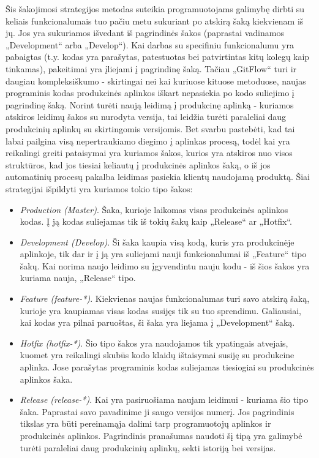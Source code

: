 \documentclass{VUMIFPSkursinis}
\begin{document}

Šis šakojimosi strategijos metodas suteikia programuotojams galimybę dirbti su keliais funkcionalumais tuo pačiu metu sukuriant po atskirą šaką kiekvienam iš jų. Jos yra sukuriamos išvedant iš pagrindinės šakos (paprastai vadinamos „Development“ arba „Develop“). Kai darbas su specifiniu funkcionalumu yra pabaigtas (t.y. kodas yra parašytas, patestuotas bei patvirtintas kitų kolegų kaip tinkamas), pakeitimai yra įliejami į pagrindinę šaką. Tačiau „GitFlow“ turi ir daugiau kompleksiškumo - skirtingai nei kai kuriuose kituose metoduose, naujas programinis kodas produkcinės aplinkos iškart nepasiekia po kodo suliejimo į pagrindinę šaką. Norint turėti naują leidimą į produkcinę aplinką - kuriamos atskiros leidimų šakos su nurodyta versija, tai leidžia turėti paraleliai daug produkcinių aplinkų su skirtingomis versijomis. Bet svarbu pastebėti, kad tai labai pailgina visą nepertraukiamo diegimo į aplinkas procesą, todėl kai yra reikalingi greiti pataisymai yra kuriamos šakos, kurios yra atskiros nuo visos struktūros, kad jos tiesiai keliautų į produkcinės aplinkos šaką, o iš jos automatinių procesų pakalba leidimas pasiekia klientų naudojamą produktą. Šiai strategijai išpildyti yra kuriamos tokio tipo šakos:

\begin{itemize}
  \item \textit{Production (Master)}. Šaka, kurioje laikomas visas produkcinės aplinkos kodas. Į ją kodas suliejamas tik iš tokių šakų kaip „Release“ ar „Hotfix“.
  
  \item \textit{Development (Develop)}. Ši šaka kaupia visą kodą, kuris yra produkcinėje aplinkoje, tik dar ir į ją yra suliejami nauji funkcionalumai iš „Feature“ tipo šakų. Kai norima naujo leidimo su įgyvendintu nauju kodu - iš šios šakos yra kuriama nauja, „Release“ tipo.

  \item \textit{Feature (feature-*)}. Kiekvienas naujas funkcionalumas turi savo atskirą šaką, kurioje yra kaupiamas visas kodas susijęs tik su tuo sprendimu. Galiausiai, kai kodas yra pilnai paruoštas, ši šaka yra liejama į „Development“ šaką.

  \item \textit{Hotfix (hotfix-*)}. Šio tipo šakos yra naudojamos tik ypatingais atvejais, kuomet yra reikalingi skubūs kodo klaidų ištaisymai susiję su produkcine aplinka. Jose parašytas programinis kodas suliejamas tiesiogiai su produkcinės aplinkos šaka.

  
  \item \textit{Release (release-*)}. Kai yra pasiruošiama naujam leidimui - kuriama šio tipo šaka. Paprastai savo pavadinime ji saugo versijos numerį. Jos pagrindinis tikslas yra būti pereinamąja dalimi tarp programuotojų aplinkos ir produkcinės aplinkos. Pagrindinis pranašumas naudoti šį tipą yra galimybė turėti paraleliai daug produkcinių aplinkų, sekti istoriją bei versijas.
\end{itemize}
\end{document}
